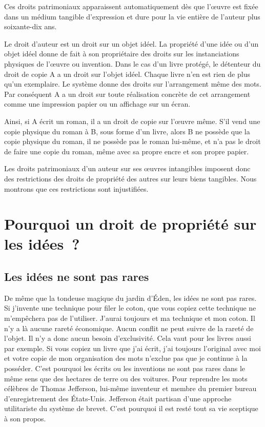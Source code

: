 Ces droits patrimoniaux apparaissent automatiquement dès que l'œuvre est fixée dans un médium tangible d'expression et dure pour la vie entière de l'auteur plus soixante-dix ans.

Le droit d'auteur est un droit sur un objet idéel. La propriété d'une idée ou d'un objet idéel donne de fait à son propriétaire des droits sur les instanciations physiques de l'œuvre ou invention. Dans le cas d'un livre protégé, le détenteur du droit de copie A a un droit sur l'objet idéel. Chaque livre n'en est rien de plus qu'un exemplaire. Le système donne des droits sur l'arrangement même des mots. Par conséquent A a un droit sur toute réalisation concrète de cet arrangement comme une impression papier ou un affichage sur un écran. 

Ainsi, si A écrit un roman, il a un droit de copie sur l'œuvre même. S'il vend une copie physique du roman à B, sous forme d'un livre, alors B ne possède que la copie physique du roman, il ne possède pas le roman lui-même, et n'a pas le droit de faire une copie du roman, même avec sa propre encre et son propre papier.

Les droits patrimoniaux d'un auteur sur ses œuvres intangibles imposent donc des restrictions des droits de propriété des autres sur leurs biens tangibles. Nous montrons que ces restrictions sont injustifiées.

\section{Pourquoi un droit de propriété sur les idées~?}

\subsection{Les idées ne sont pas rares}

De même que la tondeuse magique du jardin d'Éden, les idées ne sont pas rares. Si j'invente une technique pour filer le coton, que vous copiez cette technique ne m'empêchera pas de l'utiliser. J'aurai toujours et ma technique et mon coton. Il n'y a là aucune rareté économique. Aucun conflit ne peut suivre de la rareté de l'objet. Il n'y a donc aucun besoin d'exclusivité. Cela vaut pour les livres aussi par exemple. Si vous copiez un livre que j'ai écrit, j'ai toujours l'original avec moi et votre copie de mon organisation des mots n'exclue pas que je continue à la posséder. C'est pourquoi les écrits ou les inventions ne sont pas rares dans le même sens que des hectares de terre ou des voitures. Pour reprendre les mots célèbres de Thomas Jefferson, lui-même inventeur et membre du premier bureau d'enregistrement des États-Unis. Jefferson était partisan d'une approche utilitariste du système de brevet. C'est pourquoi il est resté tout sa vie sceptique à son propos.

